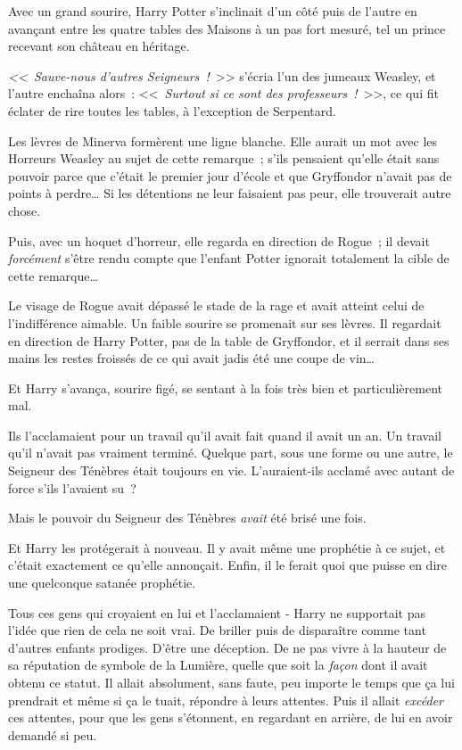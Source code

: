 Avec un grand sourire, Harry Potter s'inclinait d'un côté puis de l'autre en avançant entre les quatre tables des Maisons à un pas fort mesuré, tel un prince recevant son château en héritage.

\emph{<<~Sauve-nous d'autres Seigneurs~!}~>> s'écria l'un des jumeaux Weasley, et l'autre enchaîna alors~: <<~\emph{Surtout si ce sont des professeurs~!}~>>, ce qui fit éclater de rire toutes les tables, à l'exception de Serpentard.

Les lèvres de Minerva formèrent une ligne blanche. Elle aurait un mot avec les Horreurs Weasley au sujet de cette remarque~; s'ils pensaient qu'elle était sans pouvoir parce que c'était le premier jour d'école et que Gryffondor n'avait pas de points à perdre… Si les détentions ne leur faisaient pas peur, elle trouverait autre chose.

Puis, avec un hoquet d'horreur, elle regarda en direction de Rogue~; il devait \emph{forcément} s'être rendu compte que l'enfant Potter ignorait totalement la cible de cette remarque…

Le visage de Rogue avait dépassé le stade de la rage et avait atteint celui de l'indifférence aimable. Un faible sourire se promenait sur ses lèvres. Il regardait en direction de Harry Potter, pas de la table de Gryffondor, et il serrait dans ses mains les restes froissés de ce qui avait jadis été une coupe de vin…

\later

Et Harry s'avança, sourire figé, se sentant à la fois très bien et particulièrement mal.

Ils l'acclamaient pour un travail qu'il avait fait quand il avait un an. Un travail qu'il n'avait pas vraiment terminé. Quelque part, sous une forme ou une autre, le Seigneur des Ténèbres était toujours en vie. L'auraient-ils acclamé avec autant de force s'ils l'avaient su~?

Mais le pouvoir du Seigneur des Ténèbres \emph{avait} été brisé une fois.

Et Harry les protégerait à nouveau. Il y avait même une prophétie à ce sujet, et c'était exactement ce qu'elle annonçait. Enfin, il le ferait quoi que puisse en dire une quelconque satanée prophétie.

Tous ces gens qui croyaient en lui et l'acclamaient - Harry ne supportait pas l'idée que rien de cela ne soit vrai. De briller puis de disparaître comme tant d'autres enfants prodiges. D'être une déception. De ne pas vivre à la hauteur de sa réputation de symbole de la Lumière, quelle que soit la \emph{façon} dont il avait obtenu ce statut. Il allait absolument, sans faute, peu importe le temps que ça lui prendrait et même si ça le tuait, répondre à leurs attentes. Puis il allait \emph{excéder} ces attentes, pour que les gens s'étonnent, en regardant en arrière, de lui en avoir demandé si peu.

